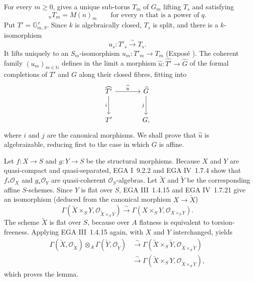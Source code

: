 For every \(m\geq0\),  gives a unique sub-torus \(T_m\)
of \(G_m\) lifting \(T_s\) and satisfying
\[
  {}_nT_m=M(n)_m
  \qquad\text{for every }n\text{ that is a power of }q.
\]
Put \(T'=\mathbb G_{m,S}^{\,r}\). Since \(k\) is algebraically
closed, \(T_s\) is split, and there is a \(k\)-isomorphism
\[
  u_s:T'_s\xrightarrow{\sim}T_s.
\]
It lifts uniquely to an \(S_m\)-isomorphism
\(u_m:T'_m\to T_m\) (Exposé ). The coherent family
\((u_m)_{m\in\mathbb N}\) defines in the limit a morphism
\(\widehat u:\widehat{T'}\to\widehat G\) of the formal completions of \(T'\) and \(G\) along their closed
fibres, fitting into
\[
\begin{tikzcd}[column sep=large,row sep=large]
\widehat{T'} \arrow[r,"\widehat u"] \arrow[d,"i"'] &
  \widehat G \arrow[d,"j"'] \\
T' & G ,
\end{tikzcd}
\]
where \(i\) and \(j\) are the canonical morphisms. We shall prove that \(\widehat u\) is algebraizable, reducing first
to the case in which \(G\) is affine.


Let \(f:X\to S\) and \(g:Y\to S\) be the structural morphisms.
Because \(X\) and \(Y\) are quasi-compact and quasi-separated,
EGA I~9.2.2 and EGA IV~1.7.4 show that
\(f_*\mathcal O_X\) and \(g_*\mathcal O_Y\) are quasi-coherent
\(\mathcal O_S\)-algebras. Let \(\widetilde X\) and \(\widetilde Y\)
be the corresponding affine \(S\)-schemes. Since \(Y\) is flat over
\(S\), EGA III~1.4.15 and EGA IV~1.7.21 give an isomorphism
(deduced from the canonical morphism \(X\to\widetilde X\))
\[
 \Gamma(\widetilde X\times_SY,
        \mathcal O_{\widetilde X\times_SY})
 \xrightarrow{\sim}
 \Gamma(X\times_SY,\mathcal O_{X\times_SY}).
\]
The scheme \(\widetilde X\) is flat over \(S\), because over \(A\)
flatness is equivalent to torsion-freeness. Applying EGA III~1.4.15
again, with \(X\) and \(Y\) interchanged, yields
\[
\begin{aligned}
 \Gamma(\widetilde X,\mathcal O_{\widetilde X})
 \otimes_A\Gamma(\widetilde Y,\mathcal O_{\widetilde Y})
 &\xrightarrow{\sim}
 \Gamma(\widetilde X\times_S\widetilde Y,
        \mathcal O_{\widetilde X\times_S\widetilde Y})\\
 &\xrightarrow{\sim}
 \Gamma(\widetilde X\times_SY,
        \mathcal O_{\widetilde X\times_SY}),
\end{aligned}
\]
which proves the lemma.

